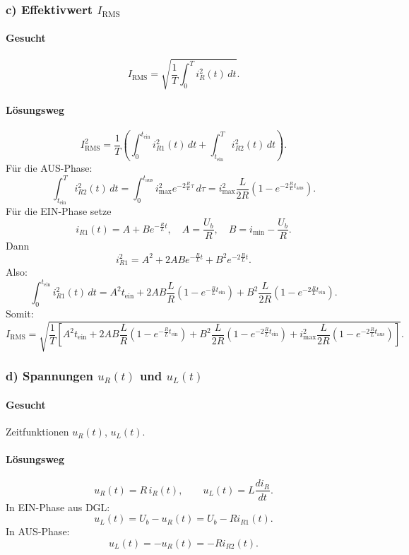 \subsubsection*{c) Effektivwert $I_{\mathrm{RMS}}$}

\paragraph{Gesucht}
\[
I_{\mathrm{RMS}}=\sqrt{\frac{1}{T}\int_0^T i_R^2(t)\,dt}.
\]

\paragraph{Lösungsweg}
\[
I_{\mathrm{RMS}}^2=\frac{1}{T}\left(
\int_0^{t_\mathrm{ein}} i_{R1}^2(t)\,dt + \int_{t_\mathrm{ein}}^T i_{R2}^2(t)\,dt
\right).
\]
Für die AUS-Phase:
\[
\int_{t_\mathrm{ein}}^T i_{R2}^2(t)\,dt
=
\int_0^{t_\mathrm{aus}} i_\mathrm{max}^2 e^{-2\frac{R}{L}\tau}\,d\tau
=
i_\mathrm{max}^2\frac{L}{2R}\left(1-e^{-2\frac{R}{L}t_\mathrm{aus}}\right).
\]
Für die EIN-Phase setze
\[
i_{R1}(t)=A+B e^{-\frac{R}{L}t},
\quad A=\frac{U_b}{R},\quad B=i_\mathrm{min}-\frac{U_b}{R}.
\]
Dann
\[
i_{R1}^2=A^2+2ABe^{-\frac{R}{L}t}+B^2e^{-2\frac{R}{L}t}.
\]
Also:
\[
\int_0^{t_\mathrm{ein}} i_{R1}^2(t)\,dt
=
A^2 t_\mathrm{ein}
+2AB\frac{L}{R}\left(1-e^{-\frac{R}{L}t_\mathrm{ein}}\right)
+B^2\frac{L}{2R}\left(1-e^{-2\frac{R}{L}t_\mathrm{ein}}\right).
\]
Somit:
\[
\boxed{
I_{\mathrm{RMS}}=\sqrt{\frac{1}{T}\left[
A^2 t_\mathrm{ein}
+2AB\frac{L}{R}\left(1-e^{-\frac{R}{L}t_\mathrm{ein}}\right)
+B^2\frac{L}{2R}\left(1-e^{-2\frac{R}{L}t_\mathrm{ein}}\right)
+i_\mathrm{max}^2\frac{L}{2R}\left(1-e^{-2\frac{R}{L}t_\mathrm{aus}}\right)
\right]}.
}
\]


\subsubsection*{d) Spannungen $u_R(t)$ und $u_L(t)$}

\paragraph{Gesucht}
Zeitfunktionen $u_R(t)$, $u_L(t)$.

\paragraph{Lösungsweg}
\[
u_R(t)=R\,i_R(t),
\qquad
u_L(t)=L\frac{di_R}{dt}.
\]
In EIN-Phase aus DGL:
\[
u_L(t)=U_b-u_R(t)=U_b-Ri_{R1}(t).
\]
In AUS-Phase:
\[
u_L(t)=-u_R(t)=-R i_{R2}(t).
\]

